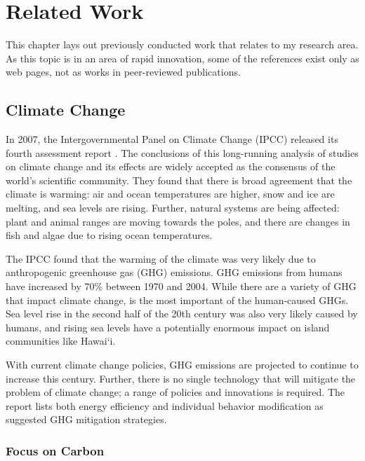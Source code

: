 \chapter{Related Work}

This chapter lays out previously conducted work that relates to my research area. As this topic is in an area of rapid innovation, some of the references exist only as web pages, not as works in peer-reviewed publications. 


\section{Climate Change}
\label{sec:climate-change}

In 2007, the Intergovernmental Panel on Climate Change (IPCC) released its fourth assessment report \cite{IPCC-synthesis-report-2007}. The conclusions of this long-running analysis of studies on climate change and its effects are widely accepted as the consensus of the world's scientific community. They found that there is broad agreement that the climate is warming: air and ocean temperatures are higher, snow and ice are melting, and sea levels are rising. Further, natural systems are being affected: plant and animal ranges are moving towards the poles, and there are changes in fish and algae due to rising ocean temperatures.

The IPCC found that the warming of the climate was very likely due to anthropogenic greenhouse gas (GHG) emissions. GHG emissions from humans have increased by 70\% between 1970 and 2004. While there are a variety of GHG that impact climate change, \COtwo is the most important of the human-caused GHGs. Sea level rise in the second half of the 20th century was also very likely caused by humans, and rising sea levels have a potentially enormous impact on island communities like Hawai`i.

With current climate change policies, GHG emissions are projected to continue to increase this century. Further, there is no single technology that will mitigate the problem of climate change; a range of policies and innovations is required. The report lists both energy efficiency and individual behavior modification as suggested GHG mitigation strategies.

\subsection{Focus on Carbon}


